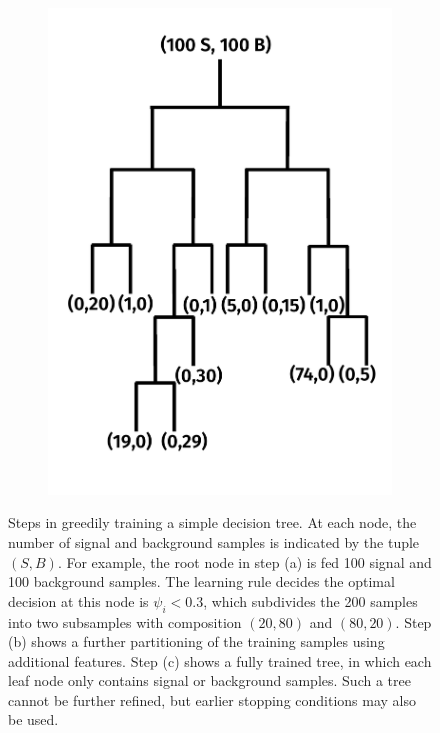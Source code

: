 \begin{figure}[]
\begin{center}
\begin{subfigure}[t]{0.32\textwidth}
            \includegraphics[width=\textwidth]{figures/toptagging/bdt/tree2.pdf}
            \caption{}
        \end{subfigure}
        \caption{Steps in greedily training a simple decision tree.
                 At each node, the number of signal and background samples is indicated by the tuple $(S,B)$.
                 For example, the root node in step (a) is fed 100 signal and 100 background samples.
                 The learning rule decides the optimal decision at this node is $\psi_i < 0.3$, which subdivides the 200 samples into two subsamples with composition $(20,80)$ and $(80,20)$.
                 Step (b) shows a further partitioning of the training samples using additional features.
                 Step (c) shows a fully trained tree, in which each leaf node only contains signal or background samples.
                 Such a tree cannot be further refined, but earlier stopping conditions may also be used.}
        \label{fig:jets:dt}
    \end{center}
\end{figure}

